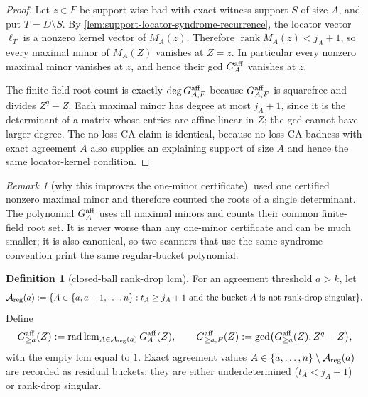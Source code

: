 \documentclass[11pt]{article}
\theoremstyle{definition}
\newtheorem{definition}[definition]{Definition}
\theoremstyle{remark}
\newtheorem{remark}[remark]{Remark}
\begin{document}
\begin{proof}
Let $z\in F$ be support-wise bad with exact witness support $S$ of size $A$, and
put $T=D\setminus S$.  By \cref{lem:support-locator-syndrome-recurrence}, the
locator vector $\boldsymbol\ell_T$ is a nonzero kernel vector of $M_A(z)$.
Therefore $\operatorname{rank}M_A(z)<j_A+1$, so every maximal minor of $M_A(Z)$
vanishes at $Z=z$.  In particular every nonzero maximal minor vanishes at $z$,
and hence their gcd $G_A^{\rm aff}$ vanishes at $z$.

The finite-field root count is exactly $\deg G_{A,F}^{\rm aff}$ because
$G_{A,F}^{\rm aff}$ is squarefree and divides $Z^q-Z$.  Each maximal minor has
degree at most $j_A+1$, since it is the determinant of a matrix whose entries are
affine-linear in $Z$; the gcd cannot have larger degree.  The no-loss CA claim is
identical, because no-loss CA-badness with exact agreement $A$ also supplies an
explaining support of size $A$ and hence the same locator-kernel condition.
\end{proof}

\begin{remark}[why this improves the one-minor certificate]
\label{rem:gcd-rankdrop-improves-one-minor}
 used one certified nonzero maximal
minor and therefore counted the roots of a single determinant.  The polynomial
$G_A^{\rm aff}$ uses all maximal minors and counts their common finite-field root
set.  It is never worse than any one-minor certificate and can be much smaller;
it is also canonical, so two scanners that use the same syndrome convention print
the same regular-bucket polynomial.
\end{remark}

\begin{definition}[closed-ball rank-drop lcm]
\label{def:closed-ball-rankdrop-lcm}
For an agreement threshold $a>k$, let
\[
        \mathcal A_{\rm reg}(a):=
        \{A\in\{a,a+1,\ldots,n\}: t_A\ge j_A+1
          \text{ and the bucket }A\text{ is not rank-drop singular}\}.
\]
Define
\[
        G_{\ge a}^{\rm aff}(Z)
        :=\operatorname{rad}\operatorname{lcm}_{A\in\mathcal A_{\rm reg}(a)}
          G_A^{\rm aff}(Z),
        \qquad
        G_{\ge a,F}^{\rm aff}(Z):=
        \gcd\bigl(G_{\ge a}^{\rm aff}(Z),Z^q-Z\bigr),
\]
with the empty lcm equal to $1$.  Exact agreement values
$A\in\{a,\ldots,n\}\setminus\mathcal A_{\rm reg}(a)$ are recorded as residual
buckets: they are either underdetermined ($t_A<j_A+1$) or rank-drop singular.
\end{definition}
\end{document}
